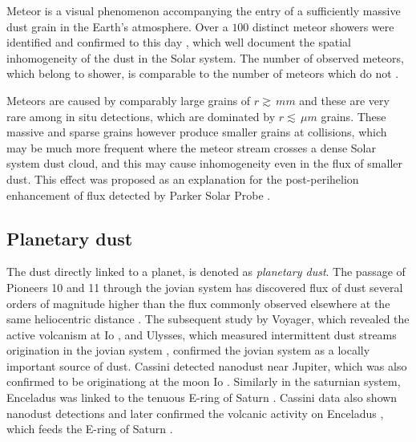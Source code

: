 Meteor is a visual phenomenon accompanying the entry of a sufficiently massive dust grain in the Earth's atmosphere. Over a $100$ distinct meteor showers were identified and confirmed to this day \citep{jenniskens2020removing}, which well document the spatial inhomogeneity of the dust in the Solar system. The number of observed meteors, which belong to shower, is comparable to the number of meteors which do not \citep{jenniskens2016cams}. 

Meteors are caused by comparably large grains of $r \gtrsim \, \si{mm}$ and these are very rare among in situ detections, which are dominated by $r \lesssim \, \si{\mu m}$ grains. These massive and sparse grains however produce smaller grains at collisions, which may be much more frequent where the meteor stream crosses a dense Solar system dust cloud, and this may cause inhomogeneity even in the flux of smaller dust. This effect was proposed as an explanation for the post-perihelion enhancement of flux detected by Parker Solar Probe \citep{szalay2021collisional}. 

\subsection{Planetary dust}

The dust directly linked to a planet, is denoted as \textit{planetary dust}. The passage of Pioneers 10 and 11 through the jovian system has discovered flux of dust several orders of magnitude higher than the flux commonly observed elsewhere at the same heliocentric distance \citep{humes1974interplanetary}. The subsequent study by Voyager, which revealed the active volcanism at Io \citep{kruger2004jovian}, and Ulysses, which measured intermittent dust streams origination in the jovian system \citep{grun1993discovery}, confirmed the jovian system as a locally important source of dust. Cassini detected nanodust near Jupiter, which was also confirmed to be originationg at the moon Io \citep{meyer2009detecting}. Similarly in the saturnian system, Enceladus was linked to the tenuous E-ring of Saturn \citep{baum1981saturn}. Cassini data also shown nanodust detections \citep{kempf2005high} and later confirmed the volcanic activity on Enceladus \citep{spahn2006cassini}, which feeds the E-ring of Saturn \citep{kempf2010enceladus}. 

